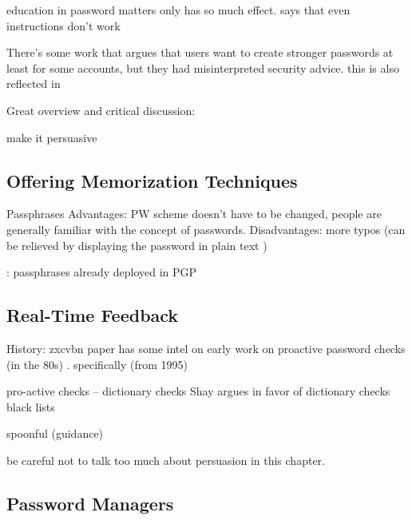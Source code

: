 	education in password matters only has so much effect. 
	\cite{Forget2007HelpingUsers} says that even instructions don't work
	
	There's some work that argues that users want to create stronger passwords at least for some accounts, but they had
	misinterpreted security advice. 
	this is also reflected in \cite{Ur2016PerceptionsPassword}
	
	Great overview and critical discussion: \cite{ZhangKennedy2016RevisitingPasswordRules}
	
	
	make it persuasive \cite{Zakaria2013DesigningEffectiveSecurityMessages}
		
	
	\subsection{Offering Memorization Techniques}
	
	
	\cite{Bonneau2014ReliableStorage56Bits}
	\cite{Forget2007HelpingUsers}
	
	Passphrases
	Advantages: PW scheme doesn't have to be changed, people are generally familiar with the concept of passwords.
	Disadvantages: more typos (can be relieved by displaying the password in plain text \cite{Melicher2016UsabilityMobileTextPasswords})
	
	\cite{Bonneau2012LinguisticProperties}: passphrases already deployed in PGP 
	
	\cite{Shay2012CorrectHorseBatteryStaple}
	
	
	
	\subsection{Real-Time Feedback}
	
	History: zxcvbn paper has some intel on early work on proactive password checks (in the 80s) \cite{Wheeler2016zxcvbn}. specifically (from 1995) \cite{Bishop1995ProactivePasswordChecking}
	
	
	pro-active checks -- dictionary checks Shay argues in favor of dictionary checks \cite{Shay2014CanLongPasswordsBeSecureAndUsable} 
	black lists \cite{Habib2017Blacklists} 
	
	spoonful (guidance) \cite{Shay2015SpoonfulOfSugar}
	\cite{Forget2008ImprovingPasswordsThroughPersuasion}
	
	be careful not to talk too much about persuasion in this chapter. 	
	
	\subsection{Password Managers}
	
